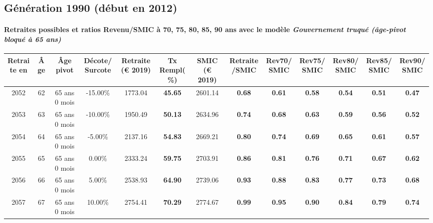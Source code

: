 \newpage 
 
\subsection{Génération 1990 (début en 2012)} 

\paragraph{Retraites possibles et ratios Revenu/SMIC à 70, 75, 80, 85, 90 ans avec le modèle \emph{Gouvernement truqué (âge-pivot bloqué à 65 ans)}}  
 
{ \scriptsize \begin{center} 
\begin{tabular}[htb]{|c|c||c|c||c|c||c||c|c|c|c|c|c|} 
\hline 
 Retraite en &  Âge &  Âge pivot &  Décote/Surcote &  Retraite (\euro{} 2019) &  Tx Rempl(\%) &  SMIC (\euro{} 2019) &  Retraite/SMIC &  Rev70/SMIC &  Rev75/SMIC &  Rev80/SMIC &  Rev85/SMIC &  Rev90/SMIC \\ 
\hline \hline 
 2052 &  62 &  65 ans 0 mois &  -15.00\% &  1773.04 &  {\bf 45.65} &  2601.14 &  {\bf {\color{red} 0.68}} &  {\bf {\color{red} 0.61}} &  {\bf {\color{red} 0.58}} &  {\bf {\color{red} 0.54}} &  {\bf {\color{red} 0.51}} &  {\bf {\color{red} 0.47}} \\ 
\hline 
 2053 &  63 &  65 ans 0 mois &  -10.00\% &  1950.49 &  {\bf 50.13} &  2634.96 &  {\bf {\color{red} 0.74}} &  {\bf {\color{red} 0.68}} &  {\bf {\color{red} 0.63}} &  {\bf {\color{red} 0.59}} &  {\bf {\color{red} 0.56}} &  {\bf {\color{red} 0.52}} \\ 
\hline 
 2054 &  64 &  65 ans 0 mois &  -5.00\% &  2137.16 &  {\bf 54.83} &  2669.21 &  {\bf {\color{red} 0.80}} &  {\bf {\color{red} 0.74}} &  {\bf {\color{red} 0.69}} &  {\bf {\color{red} 0.65}} &  {\bf {\color{red} 0.61}} &  {\bf {\color{red} 0.57}} \\ 
\hline 
 2055 &  65 &  65 ans 0 mois &  0.00\% &  2333.24 &  {\bf 59.75} &  2703.91 &  {\bf {\color{red} 0.86}} &  {\bf {\color{red} 0.81}} &  {\bf {\color{red} 0.76}} &  {\bf {\color{red} 0.71}} &  {\bf {\color{red} 0.67}} &  {\bf {\color{red} 0.62}} \\ 
\hline 
 2056 &  66 &  65 ans 0 mois &  5.00\% &  2538.93 &  {\bf 64.90} &  2739.06 &  {\bf {\color{red} 0.93}} &  {\bf {\color{red} 0.88}} &  {\bf {\color{red} 0.83}} &  {\bf {\color{red} 0.77}} &  {\bf {\color{red} 0.73}} &  {\bf {\color{red} 0.68}} \\ 
\hline 
 2057 &  67 &  65 ans 0 mois &  10.00\% &  2754.41 &  {\bf 70.29} &  2774.67 &  {\bf {\color{red} 0.99}} &  {\bf {\color{red} 0.95}} &  {\bf {\color{red} 0.90}} &  {\bf {\color{red} 0.84}} &  {\bf {\color{red} 0.79}} &  {\bf {\color{red} 0.74}} \\ 
\hline 
\hline 
\end{tabular} 
\end{center} } 
